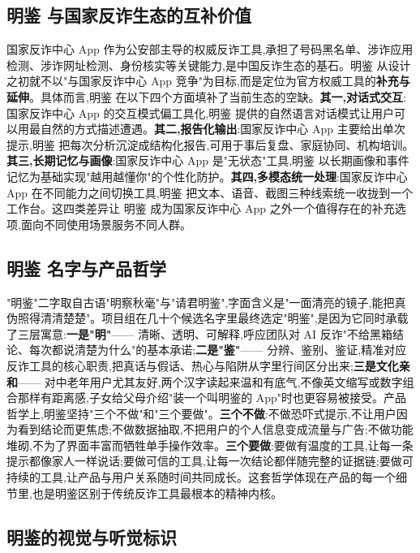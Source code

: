 \documentclass[UTF8,a4paper,12pt]{ctexart}
\begin{document}
\subsection{明鉴 与国家反诈生态的互补价值}

国家反诈中心 App 作为公安部主导的权威反诈工具,承担了号码黑名单、涉诈应用检测、涉诈网址检测、身份核实等关键能力,是中国反诈生态的基石。明鉴 从设计之初就不以"与国家反诈中心 App 竞争"为目标,而是定位为官方权威工具的\textbf{补充与延伸}。具体而言,明鉴 在以下四个方面填补了当前生态的空缺。\textbf{其一,对话式交互}:国家反诈中心 App 的交互模式偏工具化,明鉴 提供的自然语言对话模式让用户可以用最自然的方式描述遭遇。\textbf{其二,报告化输出}:国家反诈中心 App 主要给出单次提示,明鉴 把每次分析沉淀成结构化报告,可用于事后复盘、家庭协同、机构培训。\textbf{其三,长期记忆与画像}:国家反诈中心 App 是"无状态"工具,明鉴 以长期画像和事件记忆为基础实现"越用越懂你"的个性化防护。\textbf{其四,多模态统一处理}:国家反诈中心 App 在不同能力之间切换工具,明鉴 把文本、语音、截图三种线索统一收拢到一个工作台。这四类差异让 明鉴 成为国家反诈中心 App 之外一个值得存在的补充选项,面向不同使用场景服务不同人群。

\subsection{明鉴 名字与产品哲学}

"明鉴"二字取自古语"明察秋毫"与"请君明鉴",字面含义是"一面清亮的镜子,能把真伪照得清清楚楚"。项目组在几十个候选名字里最终选定"明鉴",是因为它同时承载了三层寓意:\textbf{一是"明"}—— 清晰、透明、可解释,呼应团队对 AI 反诈"不给黑箱结论、每次都说清楚为什么"的基本承诺;\textbf{二是"鉴"}—— 分辨、鉴别、鉴证,精准对应反诈工具的核心职责,把真话与假话、热心与陷阱从字里行间区分出来;\textbf{三是文化亲和}—— 对中老年用户尤其友好,两个汉字读起来温和有底气,不像英文缩写或数字组合那样有距离感,子女给父母介绍"装一个叫明鉴的 App"时也更容易被接受。产品哲学上,明鉴坚持"三个不做"和"三个要做"。\textbf{三个不做}:不做恐吓式提示,不让用户因为看到结论而更焦虑;不做数据抽取,不把用户的个人信息变成流量与广告;不做功能堆砌,不为了界面丰富而牺牲单手操作效率。\textbf{三个要做}:要做有温度的工具,让每一条提示都像家人一样说话;要做可信的工具,让每一次结论都伴随完整的证据链;要做可持续的工具,让产品与用户关系随时间共同成长。这套哲学体现在产品的每一个细节里,也是明鉴区别于传统反诈工具最根本的精神内核。

\subsection{明鉴的视觉与听觉标识}
\end{document}
